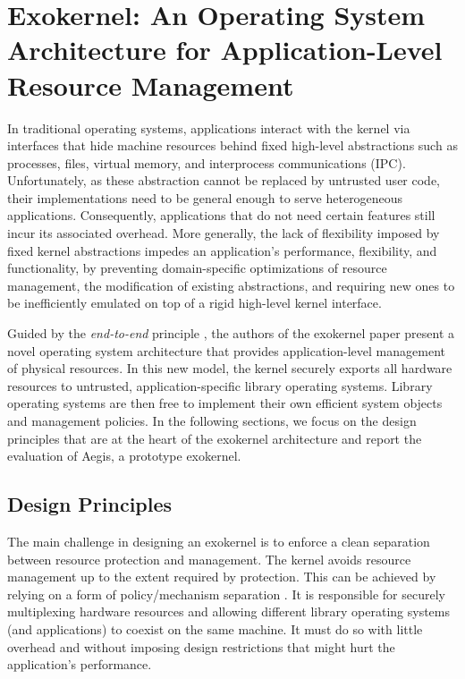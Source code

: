 \section{Exokernel: An Operating System Architecture for Application-Level Resource Management}

In traditional operating systems, applications interact with the kernel via interfaces that hide machine resources behind fixed high-level abstractions such as processes, files, virtual memory, and interprocess communications (IPC).
Unfortunately, as these abstraction cannot be replaced by untrusted user code, their implementations need to be general enough to serve heterogeneous applications.
Consequently, applications that do not need certain features still incur its associated overhead.
More generally, the lack of flexibility imposed by fixed kernel abstractions impedes an application's performance, flexibility, and functionality, by preventing domain-specific optimizations of resource management, the modification of existing abstractions, and requiring new ones to be inefficiently emulated on top of a rigid high-level kernel interface.

Guided by the \emph{end-to-end} principle \cite{DBLP:journals/tocs/SaltzerRC84}, the authors of the exokernel paper \cite{DBLP:conf/sosp/EnglerKO95} present a novel operating system architecture that provides application-level management of physical resources.
In this new model, the kernel securely exports all hardware resources to untrusted, application-specific library operating systems.
Library operating systems are then free to implement their own efficient system objects and management policies.
In the following sections, we focus on the design principles that are at the heart of the exokernel architecture and report the evaluation of Aegis, a prototype exokernel.

\subsection{Design Principles}
The main challenge in designing an exokernel is to enforce a clean separation between resource protection and management.
The kernel avoids resource management up to the extent required by protection.
This can be achieved by relying on a form of policy/mechanism separation \cite{DBLP:journals/cacm/LampsonS76}.
It is responsible for securely multiplexing hardware resources and allowing different library operating systems (and applications) to coexist on the same machine.
It must do so with little overhead and without imposing design restrictions that might hurt the application's performance.

